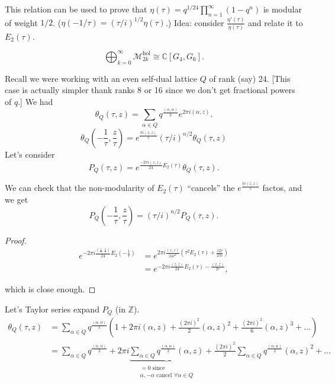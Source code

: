 \begin{remark}
\label{remark-bizzare-fact}
This relation can be used to prove that
$\eta(\tau)=q^{1/24}\prod_{n=1}^\infty(1-q^n)
$
is modular of weight $1/2$.
($\eta(-1/\tau)=(\tau/i)^{1/2}\eta(\tau)$.)
Idea: consider
$\frac{\eta'(\tau)}{\eta(\tau)}$
and relate it to $E_2(\tau)$.
\end{remark}

\noindent
$$
\bigoplus_{k=0}^\infty\mathcal{M}^{\text{hol}
}_{2k}
\cong\mathbb{C}[G_4,G_6].
$$

\medskip\noindent
Recall we were working with an even self-dual
lattice $Q$
of rank (say) 24. [This case is actually
simpler thank
ranks 8 or 16 since we don't get fractional
powers of $q$.]
We had
$$
\theta_Q(\tau,z)=\sum_{\alpha \in
Q}q^{\frac{(\alpha,\alpha)}{2}}
e^{2\pi i(\alpha,z)}.
$$
$$
\theta_Q\left(-\frac{1}{\tau},\frac{z}{\tau}
\right)
=e^{\frac{\pi i
(z,z)}{\tau}}(\tau/i)^{n/2}\theta_Q(\tau,z)
$$
Let's consider
$$
P_Q(\tau,z)=e^{\frac{-2\pi
i(z,z)}{24}E_2(\tau)}
\theta_Q(\tau,z).
$$

We can check that the non-modularity of
$E_2(\tau)$
``cancels'' the $e^{\frac{\pi i
(z,z)}{\tau}}$ factos,
and we get
$$
P_Q\left(-\frac{1}{\tau},\frac{z}{\tau}
\right)=(\tau/i)^{n/2}P_Q(\tau,z).
$$

\begin{proof}
$$
\begin{aligned}
e^{-2\pi i
\frac{\left(\frac{z}{\tau},\frac{z}{\tau}
\right)}{24}
E_2\left(-\frac{1}{\tau}\right)}
&=e^{2\pi i \frac{(z,z)}{24\tau^2}
\left(\tau^2E_2(\tau)+\frac{12\tau}{2\pi
i}\right)}\\
&=e^{-2\pi i
\frac{(z,z)}{24}E_2(\tau)-\frac{(z,z)}{2\tau}
},
\end{aligned}
$$

\noindent
which is close enough.
\end{proof}

\medskip\noindent
Let's Taylor series expand $P_Q$ (in
$\mathbb{Z}$).
$$
\begin{aligned}
\theta_Q(\tau,z)
&=\sum_{\alpha \in
Q}q^{\frac{(\alpha,\alpha)}{2}}
\left(1+2\pi i(\alpha,z)
+\frac{(2\pi i)^2}{2}(\alpha,z)^2
+\frac{(2\pi
i)^2}{6}(\alpha,z)^3+\ldots\right)\\
&=\sum_{\alpha \in
Q}q^{\frac{(\alpha,\alpha)}{2}}
+2\pi i\underbrace{\sum_{\alpha\in
Q}q^{\frac{(\alpha,\alpha)}{2}}(\alpha,z)
}_{\substack{=0\text{ since} \\
\alpha,-\alpha\text{ cancel }\forall \alpha
\in
Q}}
+\frac{(2\pi i)^2}{2}\sum_{\alpha \in
Q}q^{\frac{(\alpha,\alpha)}{2}}
(\alpha,z)^2+\ldots
\end{aligned}
$$

